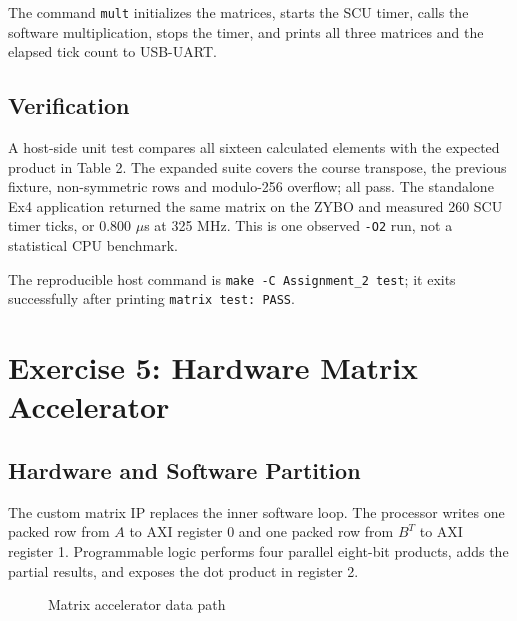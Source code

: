 \documentclass[11pt,a4paper]{article}
\begin{document}
The command \texttt{mult} initializes the matrices, starts the SCU timer, calls
the software multiplication, stops the timer, and prints all three matrices and
the elapsed tick count to USB-UART.

\subsection{Verification}
A host-side unit test compares all sixteen calculated elements with the expected
product in Table 2. The expanded suite covers the course transpose, the previous
fixture, non-symmetric rows and modulo-256 overflow; all pass. The standalone
Ex4 application returned the same matrix on the ZYBO and measured 260 SCU timer
ticks, or 0.800 $\mu$s at 325 MHz. This is one observed \texttt{-O2} run, not
a statistical CPU benchmark.

The reproducible host command is
\texttt{make -C Assignment\_2 test}; it exits successfully after printing
\texttt{matrix test: PASS}.

\section{Exercise 5: Hardware Matrix Accelerator}

\subsection{Hardware and Software Partition}
The custom matrix IP replaces the inner software loop. The processor writes one
packed row from $A$ to AXI register 0 and one packed row from $B^T$ to AXI
register 1. Programmable logic performs four parallel eight-bit products, adds
the partial results, and exposes the dot product in register 2.

\begin{figure}[H]
\centering
{}
\caption{Matrix accelerator data path}
\end{figure}
\end{document}

